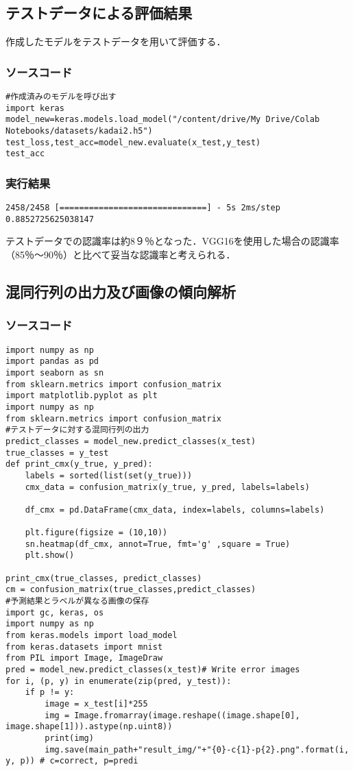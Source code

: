 \documentclass{article}
\begin{document}
\subsection{テストデータによる評価結果}
作成したモデルをテストデータを用いて評価する．
\subsubsection{ソースコード}
\begin{lstlisting}
#作成済みのモデルを呼び出す
import keras
model_new=keras.models.load_model("/content/drive/My Drive/Colab Notebooks/datasets/kadai2.h5")
test_loss,test_acc=model_new.evaluate(x_test,y_test)
test_acc
\end{lstlisting}
\subsubsection{実行結果}
\begin{lstlisting}
2458/2458 [==============================] - 5s 2ms/step
0.8852725625038147
\end{lstlisting}
テストデータでの認識率は約8９％となった．VGG16を使用した場合の認識率（85％〜90％）と比べて妥当な認識率と考えられる．
\subsection{混同行列の出力及び画像の傾向解析}
\subsubsection{ソースコード}
\begin{lstlisting}
import numpy as np
import pandas as pd
import seaborn as sn
from sklearn.metrics import confusion_matrix
import matplotlib.pyplot as plt
import numpy as np
from sklearn.metrics import confusion_matrix
#テストデータに対する混同行列の出力
predict_classes = model_new.predict_classes(x_test)
true_classes = y_test 
def print_cmx(y_true, y_pred):
    labels = sorted(list(set(y_true)))
    cmx_data = confusion_matrix(y_true, y_pred, labels=labels)
    
    df_cmx = pd.DataFrame(cmx_data, index=labels, columns=labels)
 
    plt.figure(figsize = (10,10))
    sn.heatmap(df_cmx, annot=True, fmt='g' ,square = True)
    plt.show()
 
print_cmx(true_classes, predict_classes)
cm = confusion_matrix(true_classes,predict_classes)
#予測結果とラベルが異なる画像の保存
import gc, keras, os
import numpy as np
from keras.models import load_model
from keras.datasets import mnist
from PIL import Image, ImageDraw
pred = model_new.predict_classes(x_test)# Write error images
for i, (p, y) in enumerate(zip(pred, y_test)):
    if p != y:
        image = x_test[i]*255
        img = Image.fromarray(image.reshape((image.shape[0], image.shape[1])).astype(np.uint8))
        print(img)
        img.save(main_path+"result_img/"+"{0}-c{1}-p{2}.png".format(i, y, p)) # c=correct, p=predi
\end{lstlisting}
\end{document}
